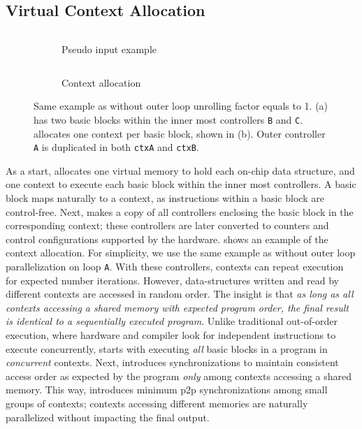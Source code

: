 \subsection{Virtual Context Allocation} 

\begin{figure}
\centering
\begin{subfigure}[b]{0.4\textwidth}
\inputminted{python}{code/spatialeg.py}
\caption{Pseudo input example}
\label{fig:contexteg}
\end{subfigure}
\hfill
\begin{subfigure}[b]{0.5\textwidth}
\inputminted{python}{code/contextalloc.py}
\caption{Context allocation}
\end{subfigure}
  \caption[Context allocation]{Same example as  without outer loop
  unrolling factor equals to 1.
  (a) has two basic blocks within the inner most controllers \texttt{B} and \texttt{C}.
  \name allocates one context per basic block, shown in (b). Outer controller \texttt{A} is
  duplicated in both \texttt{ctxA} and \texttt{ctxB}.
}
\label{fig:contextalloc}
\end{figure}

As a start, \name allocates one virtual memory to hold each on-chip data structure, and 
one context to execute each basic block within the inner most controllers. 
A basic block maps naturally to a context, as instructions within a basic block are control-free. 
Next, \name makes a copy of all controllers enclosing the basic block in the corresponding context;
these controllers are later converted to counters and control configurations supported by the
hardware. 
 shows an example of the context allocation. For simplicity, we use the same
example as  without outer loop parallelization on loop \texttt{A}.
With these controllers, contexts can repeat execution for expected number iterations. However,
data-structures written and read by different contexts are accessed in random order.
The insight is that \emph{as long as all contexts accessing a shared memory with expected program order,
the final result is identical to a sequentially executed program}.
Unlike traditional out-of-order execution, where hardware and compiler look for independent instructions to
execute concurrently, \name starts with executing \emph{all} basic blocks in a program in \emph{concurrent} contexts.
Next, \name introduces synchronizations to maintain consistent access order as expected by the 
program \emph{only} among contexts accessing a shared memory. 
This way, \name introduces minimum p2p synchronizations among small groups of contexts; contexts
accessing different memories are naturally parallelized without impacting the final output.

